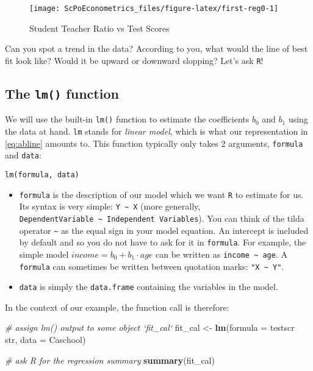 \documentclass[]{book}
\newenvironment{Shaded}{\begin{snugshade}}{\end{snugshade}}
\newcommand{\KeywordTok}[1]{\textcolor[rgb]{0.13,0.29,0.53}{\textbf{#1}}}
\newcommand{\DataTypeTok}[1]{\textcolor[rgb]{0.13,0.29,0.53}{#1}}
\newcommand{\StringTok}[1]{\textcolor[rgb]{0.31,0.60,0.02}{#1}}
\newcommand{\CommentTok}[1]{\textcolor[rgb]{0.56,0.35,0.01}{\textit{#1}}}
\newcommand{\OperatorTok}[1]{\textcolor[rgb]{0.81,0.36,0.00}{\textbf{#1}}}
\newcommand{\NormalTok}[1]{#1}
\begin{document}
\begin{figure}

{\centering \texttt{[image: ScPoEconometrics\_files/figure-latex/first-reg0-1]} 

}

\caption{Student Teacher Ratio vs Test Scores}\label{fig:first-reg0}
\end{figure}

Can you spot a trend in the data? According to you, what would the line
of best fit look like? Would it be upward or downward slopping? Let's
ask \texttt{R}!

\subsection{\texorpdfstring{The \texttt{lm()}
function}{The lm() function}}\label{the-lm-function}

We will use the built-in \texttt{lm()} function to estimate the
coefficients \(b_0\) and \(b_1\) using the data at hand. \texttt{lm}
stands for \emph{linear model}, which is what our representation in
\eqref{eq:abline} amounts to. This function typically only takes 2
arguments, \texttt{formula} and \texttt{data}:

\texttt{lm(formula,\ data)}

\begin{itemize}
\item
  \texttt{formula} is the description of our model which we want
  \texttt{R} to estimate for us. Its syntax is very simple:
  \texttt{Y\ \textasciitilde{}\ X} (more generally,
  \texttt{DependentVariable\ \textasciitilde{}\ Independent\ Variables}).
  You can think of the tilda operator \texttt{\textasciitilde{}} as the
  equal sign in your model equation. An intercept is included by default
  and so you do not have to ask for it in \texttt{formula}. For example,
  the simple model \(income = b_0 + b_1 \cdot age\) can be written as
  \texttt{income\ \textasciitilde{}\ age}. A \texttt{formula} can
  sometimes be written between quotation marks:
  \texttt{"X\ \textasciitilde{}\ Y"}.
\item
  \texttt{data} is simply the \texttt{data.frame} containing the
  variables in the model.
\end{itemize}

In the context of our example, the function call is therefore:

\begin{Shaded}
\begin{Highlighting}[]
\CommentTok{# assign lm() output to some object `fit_cal`}
\NormalTok{fit_cal <-}\StringTok{ }\KeywordTok{lm}\NormalTok{(}\DataTypeTok{formula =}\NormalTok{ testscr }\OperatorTok{~}\StringTok{ }\NormalTok{str, }\DataTypeTok{data =}\NormalTok{ Caschool)}

\CommentTok{# ask R for the regression summary}
\KeywordTok{summary}\NormalTok{(fit_cal) }
\end{Highlighting}
\end{Shaded}
\end{document}
